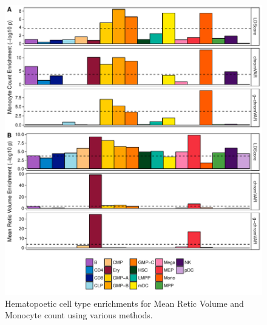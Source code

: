 \documentclass{article}\usepackage[]{graphicx}\usepackage[]{color}
\makeatletter
\def\maxwidth{ %
  \ifdim\Gin@nat@width>\linewidth
    \linewidth
  \else
    \Gin@nat@width
  \fi
}
\newenvironment{knitrout}{}{} %
\makeatother
\begin{document}
\begin{enumerate}[label=(\Alph*)]
\begin{knitrout}
\begin{figure}[H]
{\centering \includegraphics[width=\maxwidth]{figure/barplots-1} 

}

\caption[Hematopoetic cell type enrichments for Mean Retic Volume and Monocyte count using various methods]{Hematopoetic cell type enrichments for Mean Retic Volume and Monocyte count using various methods.}\label{fig:barplots}
\end{figure}


\end{knitrout}

\begin{knitrout}
\color{fgcolor}\begin{figure}[H]


\end{figure}
\end{knitrout}
\end{enumerate}
\end{document}
